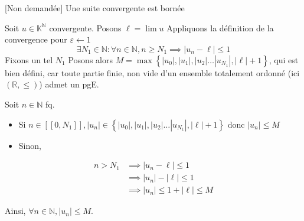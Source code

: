 \documentclass{article}
\begin{document}
\begin{question_kholle}{[Non demandée] Une suite convergente est bornée}

	Soit $u \in \mathbb{K}^{\mathbb{N}}$ convergente.
	Posons $\ell = \lim u$
	Appliquons la définition de la convergence pour $\varepsilon \leftarrow 1$
	$$
		\exists N_{1}\in \mathbb{N}: \forall n \in \mathbb{N}, n \geqslant N_{1} \implies |u_{n}-\ell| \leqslant 1
	$$
	Fixons un tel $N_{1}$
	Posons alors $M = \max\left\{ |u_{0}|, |u_{1}|, |u_{2}| \dots |u_{N_{1}}|, |\ell|+1 \right\}$, qui est bien défini, car toute partie finie, non vide d'un ensemble totalement ordonné (ici $(\mathbb{R}, \leqslant)$) admet un pgE.

	Soit $n \in \mathbb{N}$ fq.
	\begin{itemize}
		\item Si $n \in [[0, N_{1}]], |u_{n}| \in \left\{ |u_{0}|, |u_{1}|, |u_{2}| \dots |u_{N_{1}}|, |\ell|+1 \right\}$ donc $|u_{n}| \leqslant M$
		\item Sinon,
	\end{itemize}

	\begin{align*}
		n> N_{1} & \implies |u_{n} - \ell| \leqslant 1              \\
		         & \implies |u_{n}| - |\ell| \leqslant 1            \\
		         & \implies |u_{n}| \leqslant 1+ |\ell| \leqslant M
	\end{align*}

	Ainsi, $\forall n \in \mathbb{N}, |u_{n}| \leqslant M$.
\end{question_kholle}
\end{document}
